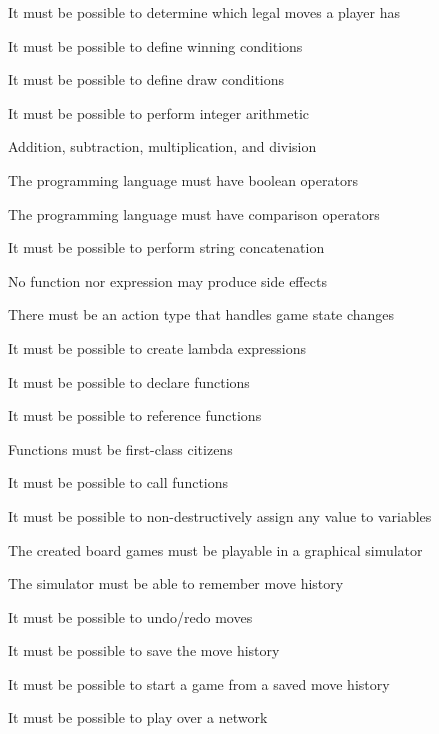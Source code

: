 \begin{enumerate}[noitemsep]
  \item It must be possible to determine which legal moves a player has
  \item It must be possible to define winning conditions
  \item It must be possible to define draw conditions
  \item It must be possible to perform integer arithmetic
  \begin{nlist}
    \item Addition, subtraction, multiplication, and division
    \item The programming language must have boolean operators
    \item The programming language must have comparison operators
  \end{nlist}
  \item It must be possible to perform string concatenation
  \item No function nor expression may produce side effects
  \item There must be an action type that handles game state changes
  \item It must be possible to create lambda expressions
  \item It must be possible to declare functions
  \item It must be possible to reference functions
  \begin{nlist}
    \item Functions must be first-class citizens
    \item It must be possible to call functions
  \end{nlist}
  \item It must be possible to non-destructively assign any value to variables
  \item The created board games must be playable in a graphical simulator
  \item The simulator must be able to remember move history
  \begin{nlist}
    \item It must be possible to undo/redo moves
    \item It must be possible to save the move history
    \begin{nlist}
      \item It must be possible to start a game from a saved move history
    \end{nlist}
  \item It must be possible to play over a network
  \end{nlist}
\end{enumerate}

